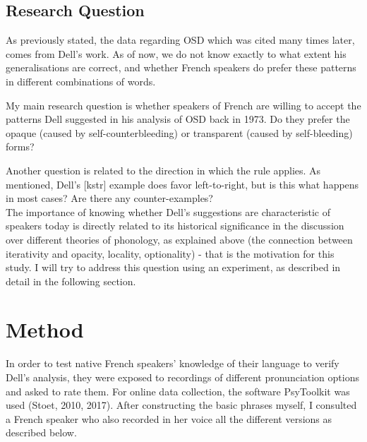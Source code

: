 \documentclass{article}
\begin{document}
\subsection{Research Question}
As previously stated, the data regarding OSD which was cited many times later, comes from Dell's work. As of now, we do not know exactly to what extent his generalisations are correct, and whether French speakers do prefer these patterns in different combinations of words.

My main research question is whether speakers of French are willing to accept the patterns Dell suggested in his analysis of OSD back in 1973.  Do they prefer the opaque (caused by self-counterbleeding) or transparent (caused by self-bleeding) forms?

Another question is related to the direction in which the rule applies. As mentioned,  Dell's [kstr] example does favor left-to-right, but is this what happens in most cases? Are there any counter-examples?\\

The importance of knowing whether Dell's suggestions are characteristic of speakers today is directly related to its historical significance in the discussion over different theories of phonology,  as explained above (the connection between iterativity and opacity, locality, optionality) - that is the motivation for this study. I will try to address this question using an experiment, as described in detail in the following section.


\clearpage
\section{Method} %
In order to test native French speakers' knowledge of their language to verify Dell's analysis, they were exposed to recordings of different pronunciation options and asked to rate them.  For online data collection,  the software PsyToolkit was used (Stoet, 2010, 2017). After constructing the basic phrases myself, I consulted a French speaker who also recorded in her voice all the different versions as described below. 
\end{document}
